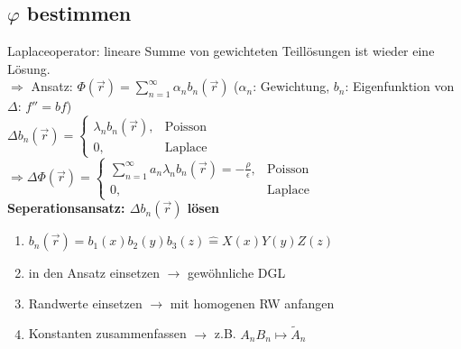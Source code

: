 \documentclass[german, fourcolumn, 6pt]{latex4ei/latex4ei_sheet}
\begin{document}
\subsection{$\varphi$ bestimmen}
Laplaceoperator: lineare Summe von gewichteten Teillösungen ist wieder eine Lösung.\\
$\Rightarrow$ Ansatz: $\Phi(\vec{r}) = \sum\limits_{n=1}^{\infty}\alpha_nb_n(\vec{r})$ ($\alpha_n$: Gewichtung, $b_n$: Eigenfunktion von $\Delta$: $f''=bf$)\\
$\Delta b_n(\vec{r})=\begin{cases}\lambda_nb_n(\vec{r}), &\text{Poisson}\\0, &\text{Laplace}\end{cases}$\\
$\Rightarrow \Delta\Phi(\vec{r}) = \begin{cases}\sum\limits_{n=1}^{\infty}a_n\lambda_nb_n(\vec{r})=-\frac{\rho}{\epsilon}, &\text{Poisson}\\0, &\text{Laplace}\end{cases}$\\
\textbf{Seperationsansatz: $\Delta b_n(\vec{r})$ lösen}
\begin{enumerate}
    \item $b_n(\vec{r}) = b_1(x)b_2(y)b_3(z) \hat{=} X(x)Y(y)Z(z)$
    \item in den Ansatz einsetzen $\rightarrow$ gewöhnliche DGL
    \item Randwerte einsetzen $\rightarrow$ mit homogenen RW anfangen
    \item Konstanten zusammenfassen $\rightarrow$ z.B. $A_n B_n \mapsto \tilde{A}_n$
\end{enumerate}
\end{document}
